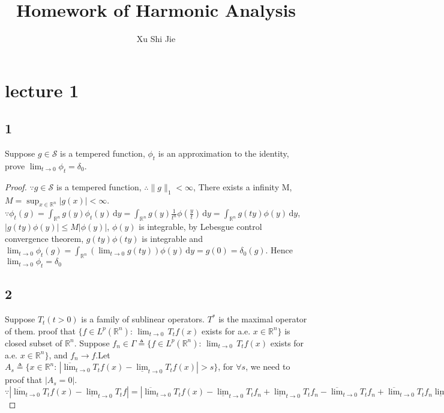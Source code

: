 \documentclass{amsart}
\theoremstyle{definition}
\theoremstyle{remark}
\numberwithin{equation}{section}
\begin{document}
	\title{Homework of Harmonic Analysis}
	\author{Xu Shi Jie}
	\maketitle
\section{lecture 1}
\subsection{1}
Suppose $g\in \mathcal{S}$ is a tempered function, $\phi_t$ is an approximation to the identity, prove $ \lim_{t\to 0}\phi_t=\delta_0$.
\begin{proof}
	$\because g\in\mathcal{S}$ is a tempered function, $\therefore \| g\|_1<\infty$, There exists a infinity M, $M=\sup_{x\in \mathbb{R}^n}|g(x)|<\infty$.
	$\because \phi_t(g)=\int_{\mathbb{R}^n}g(y)\phi_t(y)\, \mathrm{d}y=\int_{\mathbb{R}^n}g(y)\frac{1}{t^n}\phi(\frac{y}{t})\,\mathrm{d}y=\int_{\mathbb{R}^n}g(ty)\phi(y)\,\mathrm{d}y$, $|g(ty)\phi(y)|\leq M|\phi(y)|$, $\phi(y)$ is integrable, by Lebesgue control convergence theorem, $g(ty)\phi(ty)$ is integrable and \\$\lim_{t\to 0}\phi_t(g)=\int_{\mathbb{R}^n}(\lim_{t\to 0}g(ty))\phi(y)\,\mathrm{d}y=g(0)=\delta_0(g)$. Hence $\lim_{t\to 0}\phi_t=\delta_0$
\subsection{2}
Suppose $T_t(t>0)$ is a family of sublinear operators. $T^*$ is the maximal operator of them. proof that $\{f\in L^p(\mathbb{R}^n):\,\lim_{t\to 0}\,T_t f(x)$ exists for a.e. $ x\in \mathbb{R}^n\}$ is closed subset of $\mathbb{R}^n$.
\proof Suppose $f_n\in \Gamma\triangleq\{f\in L^p(\mathbb{R}^n):\,\lim_{t\to 0}\,T_t f(x)$ exists for a.e. $ x\in \mathbb{R}^n\}$, and $f_n \to f$.Let $A_s\triangleq\{x\in\mathbb{R}^n:\,|\overline{\lim}_{t\to 0} T_t f(x)-\underline{\lim}_{t\to 0} T_t f(x)|>s\}$, for $\forall s$, we need to proof that $|A_s=0|$.
$
\because|\overline{\lim}_{t\to 0} T_t f(x)-\underline{\lim}_{t\to 0} T_t f|
=|\overline{\lim}_{t\to 0} T_t f(x)-\underline{\lim}_{t\to 0} T_t f_n+\underline{\lim}_{t\to 0} T_t f_n-\overline{\lim}_{t\to 0} T_t f_n+\overline{\lim}_{t\to 0} T_t f_n\underline{\lim}_{t\to 0} T_t f|\leq |\overline{\lim}_{t\to 0} T_t f(x)-\underline{\lim}_{t\to 0} T_t f_n|+|\underline{\lim}_{t\to 0} T_t f_n-\overline{\lim}_{t\to 0} T_t f_n|+|\overline{\lim}_{t\to 0} T_t f_n\underline{\lim}_{t\to 0} T_t f|=|\overline{\lim}_{t\to 0} T_t f(x)-\underline{\lim}_{t\to 0} T_t f_n|+|\overline{\lim}_{t\to 0} T_t f_n\underline{\lim}_{t\to 0} T_t f|\leq |\overline{\lim}_{t\to 0} T_t (f-f_n)|+|\overline{\lim}_{t\to 0} T_t(f_n-f)|\leq 2T^*(f-f_n)
$


\end{proof}
\end{document}
